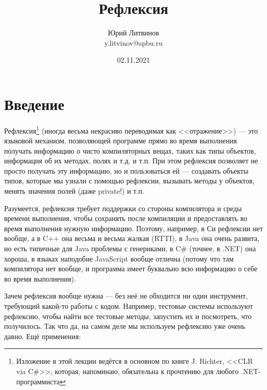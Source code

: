 \documentclass[a5paper]{article}
\title{Рефлексия}
\author{Юрий Литвинов\\\small{y.litvinov@spbu.ru}}
\date{02.11.2021}
\begin{document}
\maketitle
\thispagestyle{empty}

\section*{Введение}

Рефлексия\footnote{Изложение в этой лекции ведётся в основном по книге J. Richter, <<CLR via C\#>>, которая, напоминаю, обязательна к прочтению для любого .NET-программиста} (иногда весьма некрасиво переводимая как <<отражение>>) --- это языковой механизм, позволяющей программе прямо во время выполнения получать информацию о чисто компиляторных вещах, таких как типы объектов, информация об их методах, полях и т.д. и т.п. При этом рефлексия позволяет не просто получать эту информацию, но и пользоваться ей --- создавать объекты типов, которые мы узнали с помощью рефлексии, вызывать методы у объектов, менять значения полей (даже private!) и т.п. 

Разумеется, рефлексия требует поддержки со стороны компилятора и среды времени выполнения, чтобы сохранять после компиляции и предоставлять во время выполнения нужную информацию. Поэтому, например, в Си рефлексии нет вообще, а в C++ она весьма и весьма жалкая (RTTI), в Java она очень развита, но есть типичные для Java проблемы с генериками, в C\# (точнее, в .NET) она хороша, в языках наподобие JavaScript вообще отлична (потому что там компилятора нет вообще, и программа имеет буквально всю информацию о себе во время выполнения).

Зачем рефлексия вообще нужна --- без неё не обходится ни один инструмент, требующий какой-то работы с кодом. Например, тестовые системы используют рефлексию, чтобы найти все тестовые методы, запустить их и посмотреть, что получилось. Так что да, на самом деле мы используем рефлексию уже очень давно. Ещё применения:
\end{document}
